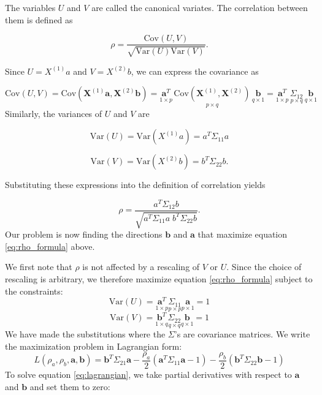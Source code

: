 The variables $U$ and $V$ are called the canonical variates. The correlation between them is defined as

\begin{equation}
\rho = \frac{\text{Cov}(U,V)}{\sqrt{\text{Var}(U)\text{Var}(V)}} .
\end{equation}

Since $U = X^{(1)}a$ and $V = X^{(2)}b$, we can express the covariance as

\begin{equation}
\text{Cov}(U,V) 
= \text{Cov}( \mathbf{X}^{(1)} \mathbf{a},  \mathbf{X}^{(2)} \mathbf{b}) 
= \underset{1 \times p}{\mathbf{a}^T} \, \underset{p \times q}{\text{Cov}(\mathbf{X}^{(1)}, \mathbf{X}^{(2)})} \, \underset{q \times 1}{\mathbf{b}}
= \underset{1 \times p}{\mathbf{a}^T} \, \underset{p \times q}{\Sigma_{12}} \, \underset{q \times 1}{\mathbf{b}}
\end{equation}
Similarly, the variances of $U$ and $V$ are

\begin{equation}
\text{Var}(U) = \text{Var}(X^{(1)}a)
= a^T \Sigma_{11} a
\end{equation}

\begin{equation}
\text{Var}(V) = \text{Var}(X^{(2)}b)
= b^T \Sigma_{22} b .
\end{equation}

Substituting these expressions into the definition of correlation yields

\begin{equation} \label{eq:rho_formula}
\rho =
\frac{a^T \Sigma_{12} b}
{\sqrt{a^T \Sigma_{11} a \; b^T \Sigma_{22} b}} .
\end{equation}
Our problem is now finding the directions $\mathbf{b}$ and $\mathbf{a}$ that maximize equation \eqref{eq:rho_formula} above.

We first note that $\rho$ is not affected by a rescaling of $V$ or $U$. Since the choice of rescaling is arbitrary, we therefore maximize equation \eqref{eq:rho_formula} subject to the constraints:
\begin{equation} \label{eq:const_u}
    \text{Var}(U) = \underset{1 \times p}{\mathbf{a}^T} \underset{p \times p}{\Sigma_{11}} \underset{p \times 1}{\mathbf{a}} = 1
\end{equation}
\begin{equation} \label{eq:const_v}
    \text{Var}(V) = \underset{1 \times q}{\mathbf{b}^T} \underset{q \times q}{\Sigma_{22}} \underset{q \times 1}{\mathbf{b}} = 1
\end{equation}
We have made the substitutions where the $\Sigma$'s are covariance matrices. We write the maximization problem in Lagrangian form:
\begin{equation} \label{eq:lagrangian}
    L(\rho_a, \rho_b, \mathbf{a}, \mathbf{b}) = \mathbf{b}^T \Sigma_{21} \mathbf{a} - \frac{\rho_a}{2}(\mathbf{a}^T \Sigma_{11} \mathbf{a} - 1) - \frac{\rho_b}{2}(\mathbf{b}^T \Sigma_{22} \mathbf{b} - 1)
\end{equation}
To solve equation \eqref{eq:lagrangian}, we take partial derivatives with respect to $\mathbf{a}$ and $\mathbf{b}$ and set them to zero:

